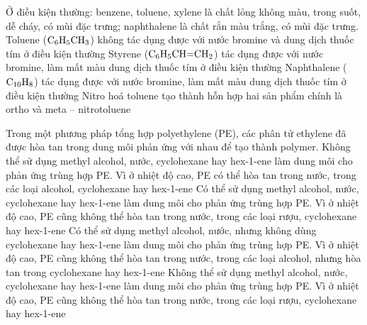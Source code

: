 \documentclass[12pt,a4paper]{article}
\begin{document}
\begin{ex}
Ở điều kiện thường: benzene, toluene, xylene là chất lỏng không màu, trong suốt, dễ cháy, có mùi đặc trưng; naphthalene là chất rắn màu trắng, có mùi đặc trưng.
\choiceTF
{\True Toluene ($\ce{C6H5CH3}$) không tác dụng được với nước bromine và dung dịch thuốc tím ở điều kiện thường}
{\True Styrene ($\ce{C6H5CH=CH2}$) tác dụng được với nước bromine, làm mất màu dung dịch thuốc tím ở điều kiện thường}
{Naphthalene ($\ce{C10H8}$) tác dụng được với nước bromine, làm mất màu dung dịch thuốc tím ở điều kiện thường}
{Nitro hoá toluene tạo thành hỗn hợp hai sản phẩm chính là ortho và meta -- nitrotoluene}
\end{ex}

\begin{ex}
Trong một phương pháp tổng hợp polyethylene (PE), các phân tử ethylene đã được hòa tan trong dung môi phản ứng với nhau để tạo thành polymer.
\choiceTF
{Không thể sử dụng methyl alcohol, nước, cyclohexane hay hex-1-ene làm dung môi cho phản ứng trùng hợp PE. Vì ở nhiệt độ cao, PE có thể hòa tan trong nước, trong các loại alcohol, cyclohexane hay hex-1-ene}
{\True Có thể sử dụng methyl alcohol, nước, cyclohexane hay hex-1-ene làm dung môi cho phản ứng trùng hợp PE. Vì ở nhiệt độ cao, PE cũng không thể hòa tan trong nước, trong các loại rượu, cyclohexane hay hex-1-ene}
{Có thể sử dụng methyl alcohol, nước, nhưng không dùng cyclohexane hay hex-1-ene làm dung môi cho phản ứng trùng hợp PE. Vì ở nhiệt độ cao, PE cũng không thể hòa tan trong nước, trong các loại alcohol, nhưng hòa tan trong cyclohexane hay hex-1-ene}
{Không thể sử dụng methyl alcohol, nước, cyclohexane hay hex-1-ene làm dung môi cho phản ứng trùng hợp PE. Vì ở nhiệt độ cao, PE cũng không thể hòa tan trong nước, trong các loại rượu, cyclohexane hay hex-1-ene}
\end{ex}
\end{document}
